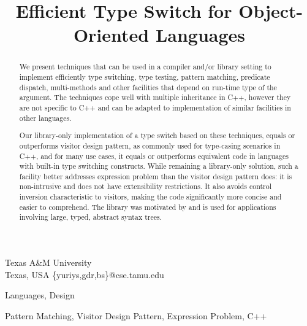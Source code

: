 \documentclass[preprint]{sigplanconf}
\makeatletter
\DeclareRobustCommand{\code}[1]{{\lstinline[breaklines=false,escapechar=@]{#1}}}
\makeatother
\begin{document}


\title{Efficient Type Switch for Object-Oriented Languages}

           {Texas A\&M University\\ Texas, USA}
           {\{yuriys,gdr,bs\}@cse.tamu.edu}

\maketitle

\begin{abstract}
We present techniques that can be used in a compiler and/or library setting to 
implement efficiently type switching, type testing, pattern matching, predicate 
dispatch, multi-methods and other facilities that depend on run-time type of the 
argument. The techniques cope well with multiple inheritance in C++, however 
they are not specific to C++ and can be adapted to implementation of similar 
facilities in other languages.

Our library-only implementation of a type switch based on these techniques, equals 
or outperforms visitor design pattern, as commonly used for type-casing 
scenarios in C++, and for many use cases, it equals or outperforms equivalent 
code in languages with built-in type switching constructs. While remaining a 
library-only solution, such a facility better addresses expression problem 
than the visitor design pattern does: it is non-intrusive and does not have 
extensibility restrictions. It also avoids control inversion characteristic to 
visitors, making the code significantly more concise and easier to comprehend.
The library was motivated by and is used for applications involving large, 
typed, abstract syntax trees.
\end{abstract}


\terms
Languages, Design

\keywords
Pattern Matching, Visitor Design Pattern, Expression Problem, C++
\end{document}

